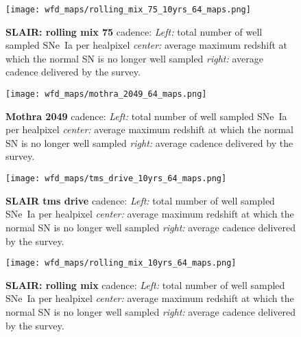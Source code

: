 \begin{figure}[!htbp]
  \begin{center}
    \texttt{[image: wfd\_maps/rolling\_mix\_75\_10yrs\_64\_maps.png]}
    \caption{{\bf SLAIR: rolling mix 75} cadence: {\em Left:} total number of well
      sampled SNe~Ia per healpixel {\em center:} average maximum
      redshift at which the normal SN is no longer well sampled {\em
        right:} average cadence delivered by the survey.}
    \label{fig:rolling_mix_75}
  \end{center}
\end{figure}


  
\begin{figure}[!htbp]
  \begin{center}
    \texttt{[image: wfd\_maps/mothra\_2049\_64\_maps.png]}
    \caption{{\bf Mothra 2049} cadence: {\em Left:} total number of well
      sampled SNe~Ia per healpixel {\em center:} average maximum
      redshift at which the normal SN is no longer well sampled {\em
        right:} average cadence delivered by the survey.}
    \label{fig:mothra_2049}
  \end{center}
\end{figure}

\begin{figure}[!htbp]
  \begin{center}
    \texttt{[image: wfd\_maps/tms\_drive\_10yrs\_64\_maps.png]}
    \caption{{\bf SLAIR tms drive} cadence: {\em Left:} total number of well
      sampled SNe~Ia per healpixel {\em center:} average maximum
      redshift at which the normal SN is no longer well sampled {\em
        right:} average cadence delivered by the survey.}
    \label{fig:tms_drive}
  \end{center}
\end{figure}


\begin{figure}[!htbp]
  \begin{center}
    \texttt{[image: wfd\_maps/rolling\_mix\_10yrs\_64\_maps.png]}
    \caption{{\bf SLAIR: rolling mix} cadence: {\em Left:} total number of well
      sampled SNe~Ia per healpixel {\em center:} average maximum
      redshift at which the normal SN is no longer well sampled {\em
        right:} average cadence delivered by the survey.}
    \label{fig:rolling_mix}
  \end{center}
\end{figure}

